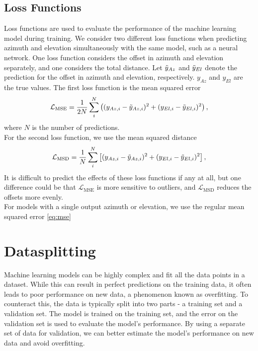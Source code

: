 \subsection{Loss Functions}
Loss functions are used to evaluate the performance of the machine learning model during training.
We consider two different loss functions when predicting azimuth and elevation simultaneously with the same model, such as a neural network.
One loss function considers the offset in azimuth and elevation separately, and one considers the total distance.
Let $\Tilde{y}_{Az}$ and $\Tilde{y}_{El}$ denote the prediction for the offset in azimuth and elevation, respectively.
$y_{Az}$ and $y_{El}$ are the true values.
The first loss function is the mean squared error 
\begin{equation}\label{eq:mse1}
    \mathcal{L}_{\text{MSE}} = \frac{1}{2N}\sum_i^N \left( (y_{Az,i}-\Tilde{y}_{Az,i})^2 + (y_{El,i}-\Tilde{y}_{El,i})^2 \right),
\end{equation}
where $N$ is the number of predictions. 
\\
For the second loss function, we use the mean squared distance
\begin{equation}\label{eq:msd}
    \mathcal{L}_{\text{MSD}} = \frac{1}{N}\sum_i^N \left[ (y_{Az,i}-\Tilde{y}_{Az,i})^2 + (y_{El,i}-\Tilde{y}_{El,i})^2 \right],
\end{equation}
It is difficult to predict the effects of these loss functions if any at all, but one difference could be that $\mathcal{L}_{\text{MSE}}$ is more sensitive to outliers,
and $\mathcal{L}_{\text{MSD}}$ reduces the offsets more evenly. \\

For models with a single output azimuth or elevation, we use the regular mean squared error \eqref{eq:mse}

\section{Datasplitting}
Machine learning models can be highly complex and fit all the data points in a dataset.
While this can result in perfect predictions on the training data, it often leads to poor performance on new data, a phenomenon known as overfitting.
To counteract this, the data is typically split into two parts - a training set and a validation set.
The model is trained on the training set, and the error on the validation set is used to evaluate the model's performance. 
By using a separate set of data for validation, we can better estimate the model's performance on new data and avoid overfitting.

